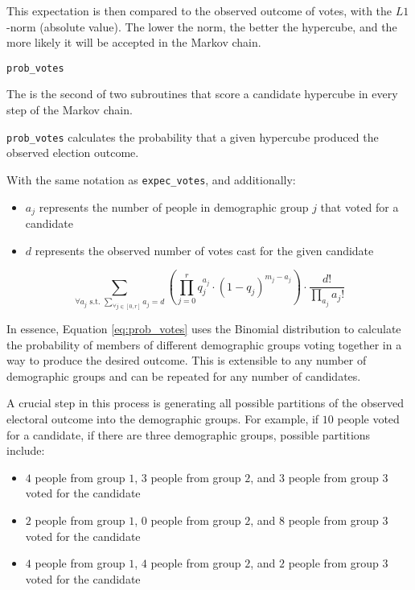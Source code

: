 This expectation is then compared to the observed outcome of votes, with the $L1$-norm (absolute value). The lower the norm, the better the hypercube, and the more likely it will be accepted in the Markov chain.


\texttt{prob\_votes}


The is the second of two subroutines that score a candidate hypercube in every step of the Markov chain.

\texttt{prob\_votes} calculates the probability that a given hypercube produced the observed election outcome.

With the same notation as \texttt{expec\_votes}, and additionally:

\begin{itemize}
  \item $a_j$ represents the number of people in demographic group $j$ that voted for a candidate
  \item $d$ represents the observed number of votes cast for the given candidate
\end{itemize}

\begin{equation}
 \sum_{\forall a_j \text{ s.t. } \sum_{\forall j \in [0, r]} a_j = d} \left(\prod_{j = 0}^r q_j^{a_j} \cdot (1 - q_j)^{m_j - a_j}\right) \cdot \frac{d!}{\prod_{a_j}a_j!}
 \label{eq:prob_votes}
\end{equation}

In essence, Equation \ref{eq:prob_votes} uses the Binomial distribution to calculate the probability of members of different demographic groups voting together in a way to produce the desired outcome. This is extensible to any number of demographic groups and can be repeated for any number of candidates.

A crucial step in this process is generating all possible partitions of the observed electoral outcome into the demographic groups. For example, if $10$ people voted for a candidate, if there are three demographic groups, possible partitions include:

\begin{itemize}
  \item $4$ people from group $1$, $3$ people from group $2$, and $3$ people from group $3$ voted for the candidate
  \item $2$ people from group $1$, $0$ people from group $2$, and $8$ people from group $3$ voted for the candidate
  \item $4$ people from group $1$, $4$ people from group $2$, and $2$ people from group $3$ voted for the candidate
\end{itemize}

